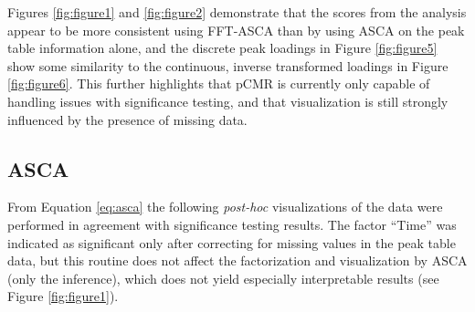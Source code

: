 \documentclass[preprint,12pt]{elsarticle}
\begin{document}
Figures \ref{fig:figure1} and \ref{fig:figure2} demonstrate that the scores from the analysis appear to be more consistent using FFT-ASCA than by using ASCA on the peak table information alone, and the discrete peak loadings in Figure \ref{fig:figure5} show some similarity to the continuous, inverse transformed loadings in Figure \ref{fig:figure6}. This further highlights that pCMR is currently only capable of handling issues with significance testing, and that visualization is still strongly influenced by the presence of missing data.  

\subsection{ASCA}

From Equation \ref{eq:asca} the following \textit{post-hoc} visualizations of the data were performed in agreement with significance testing results. The factor ``Time'' was indicated as significant only after correcting for missing values in the peak table data, but this routine does not affect the factorization and visualization by ASCA (only the inference), which does not yield especially interpretable results (see Figure \ref{fig:figure1}). 
\end{document}
